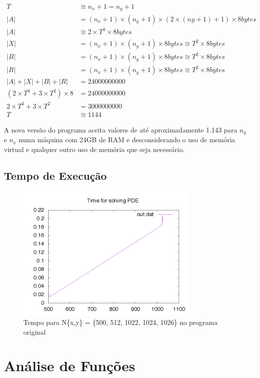 \documentclass[12pt]{article}
\begin{document}
	\begin{align*}
		T &\cong n_x + 1 = n_y + 1 \\
		|A| &= (n_x+1)\times(n_y+1)\times(2\times(ny+1)+1)\times8 bytes \\
		|A| &\cong 2\times T^3\times8 bytes \\
		|X| &= (n_x+1)\times(n_y+1)\times8 bytes \cong T^2\times8 bytes \\
		|B| &= (n_x+1)\times(n_y+1)\times8 bytes \cong T^2\times8 bytes \\
		|R| &= (n_x+1)\times(n_y+1)\times8 bytes \cong T^2\times8 bytes \\
		|A| + |X| + |B| + |R| &= 24000000000 \\
		(2\times T^3 + 3\times T^2)\times8 &= 24000000000 \\
		2\times T^3 + 3\times T^2 &= 3000000000 \\
		T &\cong 1144
	\end{align*}

	A nova versão do programa aceita valores de até aproximadamente 1.143 para $n_y$ e $n_x$ numa máquina com 24GB de 	RAM e desconsiderando o uso de memória virtual e qualquer outro uso de memória que seja necessário.

	\subsection{Tempo de Execução}
	\begin{figure}[ht!]
		\centering
		\includegraphics[width=90mm]{oldtime.png}
		\caption{Tempo para N\{x,y\} = \{500, 512, 1022, 1024, 1026\} no programa original}
	\end{figure}
	
	\newpage

\section{Análise de Funções}
\end{document}
